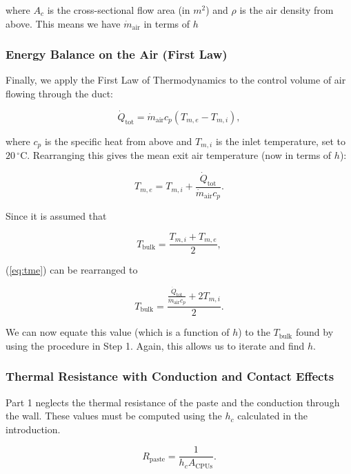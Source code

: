 \documentclass[12pt, titlepage]{article}
\begin{document}
where $A_c$ is the cross-sectional flow area (in $m^2$) and $\rho$ is the air density from above. This means we have $\dot{m}_{\text{air}}$ in terms of $h$

\subsubsection{Energy Balance on the Air (First Law)}
Finally, we apply the First Law of Thermodynamics to the control volume of air flowing through the duct:

\begin{equation}
\dot{Q}_{\text{tot}} = \dot{m}_{\text{air}} c_p (T_{m,e} - T_{m,i}),
\end{equation}

where $c_p$ is the specific heat from above and $T_{m,i}$ is the inlet temperature, set to $20\,^\circ\mathrm{C}$. Rearranging this gives the mean exit air temperature (now in terms of $h$):

\begin{equation}
T_{m,e} = T_{m,i} + \frac{\dot{Q}_{\text{tot}}}{\dot{m}_{\text{air}} c_p}.
\label{eq:tme}
\end{equation}

Since it is assumed that

\begin{equation}
T_{\text{bulk}} = \frac{T_{m,i} + T_{m,e}}{2},
\end{equation}

(\ref{eq:tme}) can be rearranged to

\begin{equation}
T_{\text{bulk}} = \frac{\frac{\dot{Q}_{\text{tot}}}{\dot{m}_{\text{air}}c_p} + 2 T_{m,i}}{2}.
\end{equation}

We can now equate this value (which is a function of $h$) to the $T_{\text{bulk}}$  found by using the procedure in Step 1. Again, this allows us to iterate and find $h$.

\subsubsection{Thermal Resistance with Conduction and Contact Effects}

Part 1 neglects the thermal resistance of the paste and the conduction through the wall. These values must be computed using the $h_c$ calculated in the introduction.

\begin{equation}
R_{\text{paste}} = \frac{1}{h_c A_{\text{CPUs}}}.
\end{equation}
\end{document}
